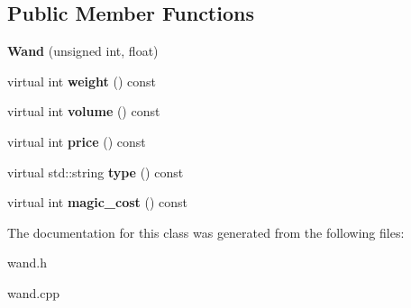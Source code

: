 \subsection*{Public Member Functions}
\begin{DoxyCompactItemize}
\item 
\hypertarget{classda__game_1_1Wand_ae558206db7df170d40b3dfb32b1ce4cd}{
{\bfseries Wand} (unsigned int, float)}
\label{classda__game_1_1Wand_ae558206db7df170d40b3dfb32b1ce4cd}

\item 
\hypertarget{classda__game_1_1Wand_a20d019963c6c21c8b98c8cfd67e4edad}{
virtual int {\bfseries weight} () const }
\label{classda__game_1_1Wand_a20d019963c6c21c8b98c8cfd67e4edad}

\item 
\hypertarget{classda__game_1_1Wand_a85feab0eb776970c6b4ccd1d0bbd012f}{
virtual int {\bfseries volume} () const }
\label{classda__game_1_1Wand_a85feab0eb776970c6b4ccd1d0bbd012f}

\item 
\hypertarget{classda__game_1_1Wand_ac6d0ee9dddccc7b8b4a65ad1e137c2da}{
virtual int {\bfseries price} () const }
\label{classda__game_1_1Wand_ac6d0ee9dddccc7b8b4a65ad1e137c2da}

\item 
\hypertarget{classda__game_1_1Wand_ada77c13289de7d6a7ce00c39827c3023}{
virtual std::string {\bfseries type} () const }
\label{classda__game_1_1Wand_ada77c13289de7d6a7ce00c39827c3023}

\item 
\hypertarget{classda__game_1_1Wand_a9ae78043a8d08b22cb608b360f491ab3}{
virtual int {\bfseries magic\_\-cost} () const }
\label{classda__game_1_1Wand_a9ae78043a8d08b22cb608b360f491ab3}

\end{DoxyCompactItemize}


The documentation for this class was generated from the following files:\begin{DoxyCompactItemize}
\item 
wand.h\item 
wand.cpp\end{DoxyCompactItemize}
